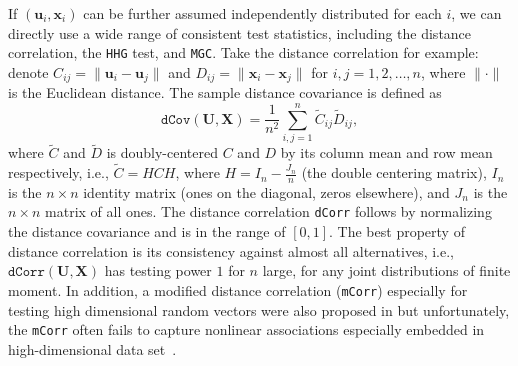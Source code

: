 \documentclass[11pt]{article}
\theoremstyle{definition}
\begin{document}
If $(\mathbf{u}_{i}, \mathbf{x}_{i} )$ can be further assumed independently distributed for each $i$, we can directly use a wide range of consistent test statistics, including the distance correlation, the \texttt{HHG} test, and \texttt{MGC}. Take the distance correlation for example: denote $C_{ij} = \parallel \mathbf{u}_{i} - \mathbf{u}_{j} \parallel$ and $D_{ij} = \parallel \mathbf{x}_{i} - \mathbf{x}_{j} \parallel$ for $i,j=1,2, \ldots ,n$, where $\parallel \cdot \parallel$ is the Euclidean distance. The sample distance covariance is defined as 
\begin{equation}	 
\label{eq:dCov}
\texttt{dCov}(\mathbf{U}, \mathbf{X}) = \frac{1}{n^2} \sum\limits_{i,j=1}^{n} \tilde{C}_{ij} \tilde{D}_{ij},
\end{equation}
where $\tilde{C}$ and $\tilde{D}$ is doubly-centered $C$ and $D$ by its column mean and row mean respectively, i.e., $\tilde{C}=HCH$, where $H=I_{n}-\frac{J_{n}}{n}$ (the double centering matrix), $I_n$ is the $n \times n$ identity matrix (ones on the diagonal, zeros elsewhere), and $J_n$ is the $n \times n$ matrix of all ones. The distance correlation \texttt{dCorr} follows by normalizing the distance covariance and is in the range of $[0,1]$. The best property of distance correlation is its consistency against almost all alternatives, i.e., $\texttt{dCorr}(\mathbf{U}, \mathbf{X})$ has testing power $1$ for $n$ large, for any joint distributions of finite moment.  In addition, a modified distance correlation (\texttt{mCorr}) especially for testing high dimensional random vectors were also proposed in \cite{szekely2013distance} but unfortunately, the \texttt{mCorr} often fails to capture nonlinear associations especially embedded in high-dimensional data set~\citep{shen2016discovering, heller2012consistent}. 
\end{document}
